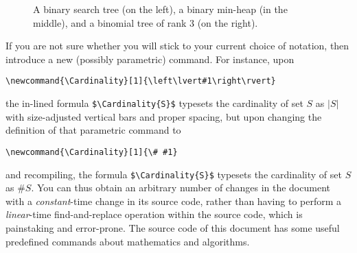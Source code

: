 \documentclass[a4paper,11pt]{article}
\newcommand{\Cardinality}[1]{\left\lvert#1\right\rvert}
\begin{document}
\begin{figure}[t] %
  \begin{center}
     \hspace{4mm}
     \hspace{4mm}
  \end{center}
  \caption{A binary search tree (on the left), a binary min-heap (in
    the middle), and a binomial tree of rank $3$ (on the right).}
  \label{fig:trees}
\end{figure}

If you are not sure whether you will stick to your current choice of
notation, then introduce a new (possibly parametric) command.  For
instance, upon
\begin{center}
  \verb|\newcommand{\Cardinality}[1]{\left\lvert#1\right\rvert}|
\end{center}
the in-lined formula \verb|$\Cardinality{S}$| typesets the cardinality
of set $S$ as $\Cardinality{S}$ with size-adjusted vertical bars and
proper spacing, but upon changing the definition of that parametric
command to
\begin{center}
  \verb|\newcommand{\Cardinality}[1]{\# #1}|
\end{center}
and recompiling, the formula \verb|$\Cardinality{S}$| typesets the
cardinality of set $S$ as $\#S$.
%
You can thus obtain an arbitrary number of changes in the document
with a \emph{constant}-time change in its source code, rather than
having to perform a \emph{linear}-time find-and-replace operation
within the source code, which is painstaking and error-prone.  The
source code of this document has some useful predefined commands about
mathematics and algorithms.
\end{document}

